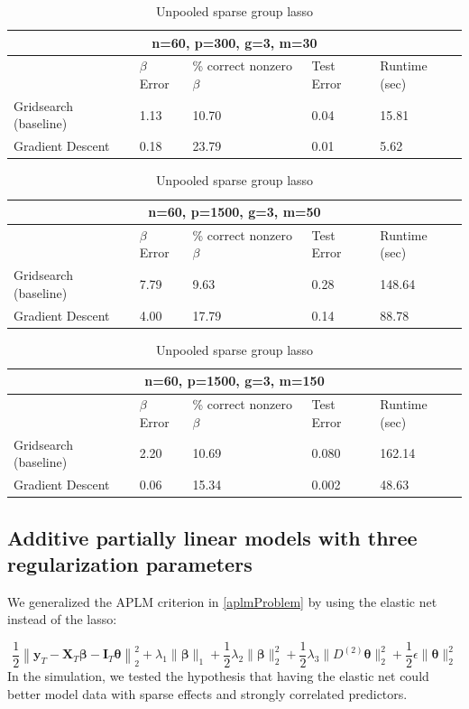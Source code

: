 \documentclass[10pt,letterpaper]{article}
\begin{document}
\begin{table}
\begin{center}
\begin{tabular}{| l | l | l | l | l | }
\hline
\multicolumn{5}{|c|}{n=60, p=300, g=3, m=30}\\
\hline
 & $\beta$ Error & \% correct nonzero $\beta$ & Test Error & Runtime (sec) \\
\hline
Gridsearch (baseline) & 1.13 & 10.70 & 0.04 & 15.81 \\
\hline
Gradient Descent & 0.18 & 23.79 & 0.01 & 5.62 \\
\hline
\end{tabular}

\begin{tabular}{| l | l | l | l | l | }
\hline
\multicolumn{5}{|c|}{n=60, p=1500, g=3, m=50}\\
\hline
 & $\beta$ Error & \% correct nonzero $\beta$ & Test Error & Runtime (sec) \\
\hline
Gridsearch (baseline) & 7.79 & 9.63 & 0.28 & 148.64 \\
\hline
Gradient Descent & 4.00 & 17.79 & 0.14 & 88.78 \\
\hline
\end{tabular}

\begin{tabular}{| l | l | l | l | l | }
\hline
\multicolumn{5}{|c|}{n=60, p=1500, g=3, m=150}\\
\hline
 & $\beta$ Error & \% correct nonzero $\beta$ & Test Error & Runtime (sec) \\
\hline
Gridsearch (baseline) & 2.20 & 10.69 & 0.080 & 162.14 \\
\hline
Gradient Descent & 0.06 & 15.34 & 0.002 & 48.63 \\
\hline
\end{tabular}
\end{center}
\caption {Unpooled sparse group lasso}
\label{table:unpooled}
\end{table}

\subsection{Additive partially linear models with three regularization parameters}
We generalized the APLM criterion in \eqref{aplmProblem} by using the elastic net instead of the lasso:

\begin{equation}
\frac{1}{2} \left \|
\boldsymbol{y}_T
- \boldsymbol{X}_T\boldsymbol{\beta}
- \boldsymbol{I}_T \boldsymbol{\theta} \right \|^2_2
+ \lambda_1 \| \boldsymbol \beta \|_1
+ \frac{1}{2} \lambda_2 \| \boldsymbol \beta \|_2^2
+ \frac{1}{2} \lambda_3 \| D^{(2)} \boldsymbol \theta \|_2^2
+ \frac{1}{2} \epsilon \| \boldsymbol{\theta} \|_2^2
\end{equation}
In the simulation, we tested the hypothesis that having the elastic net could better model data with sparse effects and strongly correlated predictors.
\end{document}
